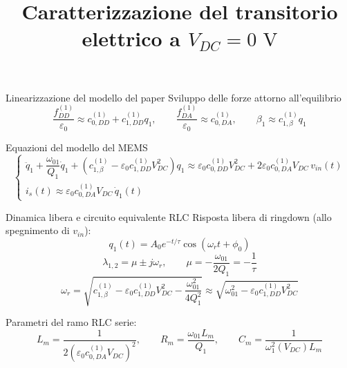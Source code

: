 \documentclass[aspectratio=169, 10pt]{beamer}
\title{Caratterizzazione del transitorio elettrico a $V_{DC} = 0\text{ V}$}
\date{}
\begin{document}
\begin{frame}{Linearizzazione del modello del paper}
\vspace{0.2em}
{\small Sviluppo delle forze attorno all'equilibrio}
\vspace{0.2em}
\[
  \frac{f_{DD}^{(1)}}{\varepsilon_0} \approx c_{0,DD}^{(1)} + c_{1,DD}^{(1)} q_1, \qquad
  \frac{f_{DA}^{(1)}}{\varepsilon_0} \approx c_{0,DA}^{(1)}, \qquad
  \beta_1 \approx c_{1,\beta}^{(1)} q_1
\]

\vspace{0.6em}
{\small Equazioni del modello del MEMS}
\vspace{0.2em}
\[
  \begin{cases}
    \ddot{q}_1 + \dfrac{\omega_{01}}{Q_1}\dot{q}_1 + \left(c_{1,\beta}^{(1)} - \varepsilon_0 c_{1,DD}^{(1)} V_{DC}^2\right) q_1 \approx \varepsilon_0 c_{0,DD}^{(1)} V_{DC}^2 + 2\varepsilon_0 c_{0,DA}^{(1)} V_{DC}\, v_{in}(t) \\[10pt]
    i_s(t) \approx \varepsilon_0 c_{0,DA}^{(1)} V_{DC}\, \dot{q}_1(t)
  \end{cases}
\]
\end{frame}

\begin{frame}{Dinamica libera e circuito equivalente RLC}
\vspace{0.2em}
{\small Risposta libera di ringdown (allo spegnimento di $v_{in}$):}
\vspace{0.2em}
\[
  q_{1}(t) = A_0 e^{-t/\tau} \cos(\omega_r t + \phi_0)
\]
\[
  \lambda_{1,2} = \mu \pm j\omega_r, \qquad \mu = -\frac{\omega_{01}}{2Q_1} = -\frac{1}{\tau}
\]
\[
  \omega_r = \sqrt{c_{1,\beta}^{(1)} - \varepsilon_0 c_{1,DD}^{(1)} V_{DC}^2 - \frac{\omega_{01}^2}{4Q_1^2}} \approx \sqrt{\omega_{01}^2 - \varepsilon_0 c_{1,DD}^{(1)} V_{DC}^2}
\]

\vspace{0.4em}
{\small Parametri del ramo RLC serie:}
\vspace{0.2em}
\[
  L_m = \frac{1}{2(\varepsilon_0 c_{0,DA}^{(1)} V_{DC})^2}, \qquad
  R_m = \frac{\omega_{01} L_m}{Q_1}, \qquad
  C_m = \frac{1}{\omega_1^2(V_{DC}) L_m}
\]
\end{frame}
\end{document}
